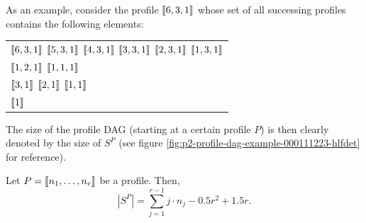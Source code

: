 As an example, consider the profile $\left\llbracket 6,3,1 \right\rrbracket$ whose set of all successing profiles contains the following elements:

\begin{center}
  \begin{tabular}{l}
    $\left\llbracket 6,3,1 \right\rrbracket$ \quad $\left\llbracket 5,3,1 \right\rrbracket$ \quad $\left\llbracket 4,3,1 \right\rrbracket$ \quad $\left\llbracket 3,3,1 \right\rrbracket$ \quad $\left\llbracket 2,3,1 \right\rrbracket$ \quad $\left\llbracket 1,3,1 \right\rrbracket$ \\
    $\left\llbracket 1,2,1 \right\rrbracket$ \quad $\left\llbracket 1,1,1 \right\rrbracket$ \\
    $\left\llbracket 3,1 \right\rrbracket$ \quad $\left\llbracket 2,1 \right\rrbracket$ \quad $\left\llbracket 1,1 \right\rrbracket$ \\
    $\left\llbracket 1 \right\rrbracket$
  \end{tabular}
\end{center}

The size of the profile DAG (starting at a certain profile $P$) is then clearly denoted by the size of $S^P$ (see figure \ref{fig:p2-profile-dag-example-000111223-hlfdet} for reference).

\begin{lemma}
  \label{lem:profile-dags-exact-size}
  Let $P=\left\llbracket n_1,\dots,n_r \right\rrbracket$ be a profile. Then, 
  \begin{equation*}
    \left| S^P \right| = 
    \sum _{j=1}^{r-1} j \cdot n_j 
    -0.5r^2 + 1.5 r.
  \end{equation*}
\end{lemma}


